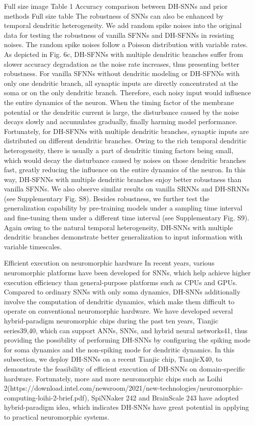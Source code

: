 Full size image
Table 1 Accuracy comparison between DH-SNNs and prior methods
Full size table
The robustness of SNNs can also be enhanced by temporal dendritic heterogeneity. We add random spike noises into the original data for testing the robustness of vanilla SFNNs and DH-SFNNs in resisting noises. The random spike noises follow a Poisson distribution with variable rates. As depicted in Fig. 6c, DH-SFNNs with multiple dendritic branches suffer from slower accuracy degradation as the noise rate increases, thus presenting better robustness. For vanilla SFNNs without dendritic modeling or DH-SFNNs with only one dendritic branch, all synaptic inputs are directly concentrated at the soma or on the only dendritic branch. Therefore, each noisy input would influence the entire dynamics of the neuron. When the timing factor of the membrane potential or the dendritic current is large, the disturbance caused by the noise decays slowly and accumulates gradually, finally harming model performance. Fortunately, for DH-SFNNs with multiple dendritic branches, synaptic inputs are distributed on different dendritic branches. Owing to the rich temporal dendritic heterogeneity, there is usually a part of dendritic timing factors being small, which would decay the disturbance caused by noises on those dendritic branches fast, greatly reducing the influence on the entire dynamics of the neuron. In this way, DH-SFNNs with multiple dendritic branches enjoy better robustness than vanilla SFNNs. We also observe similar results on vanilla SRNNs and DH-SRNNs (see Supplementary Fig. S8). Besides robustness, we further test the generalization capability by pre-training models under a sampling time interval and fine-tuning them under a different time interval (see Supplementary Fig. S9). Again owing to the natural temporal heterogeneity, DH-SNNs with multiple dendritic branches demonstrate better generalization to input information with variable timescales.

Efficient execution on neuromorphic hardware
In recent years, various neuromorphic platforms have been developed for SNNs, which help achieve higher execution efficiency than general-purpose platforms such as CPUs and GPUs. Compared to ordinary SNNs with only soma dynamics, DH-SNNs additionally involve the computation of dendritic dynamics, which make them difficult to operate on conventional neuromorphic hardware. We have developed several hybrid-paradigm neuromorphic chips during the past ten years, Tianjic series39,40, which can support ANNs, SNNs, and hybrid neural networks41, thus providing the possibility of performing DH-SNNs by configuring the spiking mode for soma dynamics and the non-spiking mode for dendritic dynamics. In this subsection, we deploy DH-SNNs on a recent Tianjic chip, TianjicX40, to demonstrate the feasibility of efficient execution of DH-SNNs on domain-specific hardware. Fortunately, more and more neuromorphic chips such as Loihi 2(https://download.intel.com/newsroom/2021/new-technologies/neuromorphic-computing-loihi-2-brief.pdf), SpiNNaker 242 and BrainScale 243 have adopted hybrid-paradigm idea, which indicates DH-SNNs have great potential in applying to practical neuromorphic systems.

